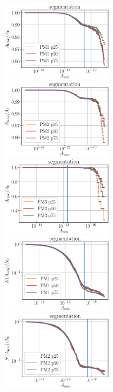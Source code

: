 \documentclass[draft,jgrga]{agutexSI2019}
\begin{document}
\begin{article}
\begin{figure}
\noindent\includegraphics[height=4cm]{figures/SI_figures/segm_A_vs_Amin_PM1.eps}
\noindent\includegraphics[height=4cm]{figures/SI_figures/segm_A_vs_Amin_PM2.eps}
\noindent\includegraphics[height=4cm]{figures/SI_figures/segm_A_vs_Amin_PM3.eps}\\
\noindent\includegraphics[height=4cm]{figures/SI_figures/segm_N_vs_Amin_PM1.eps}
\noindent\includegraphics[height=4cm]{figures/SI_figures/segm_N_vs_Amin_PM2.eps}

\end{figure}
\end{article}
\end{document}
